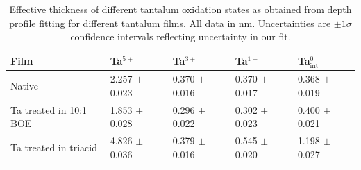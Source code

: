 \documentclass{WileyMSP-template}
\begin{document}
\begin{table}[h]
 \caption{Effective thickness of different tantalum oxidation states as obtained from depth profile fitting for different tantalum films. All data in nm. Uncertainties are $\pm{}1\sigma{}$ confidence intervals reflecting uncertainty in our fit.}
 \label{table1}
 \centering
 \setlength{\tabcolsep}{10pt}
  \begin{tabular}[htbp]{@{}lllll@{}}
    \hline
    Film & Ta$^{5+}$ & Ta$^{3+}$ & Ta$^{1+}$ & Ta$^{0}_{\text{int}}$ \\
    \hline
    Native & 2.257 $\pm$ 0.023 & 0.370 $\pm$ 0.016 & 0.370 $\pm$ 0.017 & 0.368 $\pm$ 0.019\\
    Ta treated in 10:1 BOE &  1.853 $\pm$ 0.028 & 0.296 $\pm$ 0.022 & 0.302 $\pm$ 0.023 & 0.400 $\pm$ 0.021\\
    Ta treated in triacid & 4.826 $\pm$ 0.036 & 0.379 $\pm$ 0.016 & 0.545 $\pm$ 0.020 & 1.198 $\pm$ 0.027\\
    \hline
    
  \end{tabular}
\end{table}

\pagebreak


%

\end{document}
